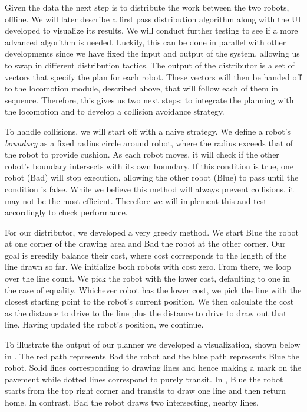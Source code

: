 Given the data the next step is to distribute the work between the two robots, offline. We will later describe a first pass distribution algorithm along with the UI developed to visualize its results. We will conduct further testing to see if a more advanced algorithm is needed. Luckily, this can be done in parallel with other developments since we have fixed the input and output of the system, allowing us to swap in different distribution tactics. The output of the distributor is a set of vectors that specify the plan for each robot. These vectors will then be handed off to the locomotion module, described above, that will follow each of them in sequence. Therefore, this gives us two next steps: to integrate the planning with the locomotion and to develop a collision avoidance strategy.

To handle collisions, we will start off with a naive strategy. We define a robot's \textit{boundary} as a fixed radius circle around robot, where the radius exceeds that of the robot to provide cushion. As each robot moves, it will check if the other robot's boundary intersects with its own boundary. If this condition is true, one robot (Bad) will stop execution, allowing the other robot (Blue) to pass until the condition is false. While we believe this method will always prevent collisions, it may not be the most efficient. Therefore we will implement this and test accordingly to check performance.

For our distributor, we developed a very greedy method. We start Blue the robot at one corner of the drawing area and Bad the robot at the other corner. Our goal is greedily balance their cost, where cost corresponds to the length of the line drawn so far. We initialize both robots with cost zero. From there, we loop over the line count. We pick the robot with the lower cost, defaulting to one in the case of equality. Whichever robot has the lower cost, we pick the line with the closest starting point to the robot's current position. We then calculate the cost as the distance to drive to the line plus the distance to drive to draw out that line. Having updated the robot's position, we continue. 

To illustrate the output of our planner we developed a visualization, shown below in . The red path represents Bad the robot and the blue path represents Blue the robot. Solid lines corresponding to drawing lines and hence making a mark on the pavement while dotted lines correspond to purely transit. In , Blue the robot starts from the top right corner and transits to draw one line and then return home. In contrast, Bad the robot draws two intersecting, nearby lines.

